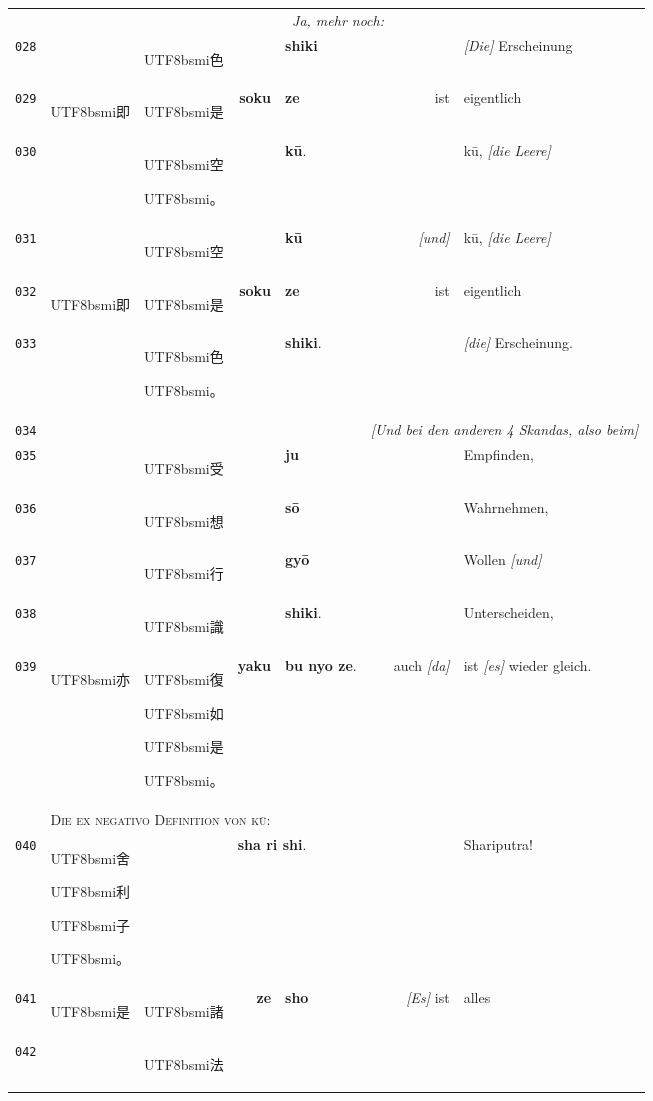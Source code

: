 \documentclass[
DIV=calc,
BCOR=5mm,
11pt,
headings=small,
oneside,
bibtotocnumbered,
english,ngerman]{scrartcl}
\newcommand{\cnbsmi}[1]{\begin{CJK}{UTF8}{bsmi}#1\end{CJK}}
\begin{document}
\begin{center}
\begin{tabular}{r|rl|rl|rl}
  ~ & ~ & ~ & ~ & \multicolumn{2}{l}{\textrm{~\emph{Ja, mehr noch:}}}  \\  
{\tiny\texttt{028}}&
  ~ & \cnbsmi{色} &
  ~ & \textbf{shiki} & 
  ~ & \textrm{\emph{[Die]} Erscheinung} \\  
{\tiny\texttt{029}}&
  \cnbsmi{即} & \cnbsmi{是} & 
  \textbf{soku} & \textbf{ze} &
  \textrm{ist} & \textrm{eigentlich} \\  
{\tiny\texttt{030}}&
  ~ & \cnbsmi{空} \cnbsmi{。} &
  ~ & \textbf{kū}. &
  ~ & \textrm{kū, \emph{[die Leere]}} \\
 \hdashline
 {\tiny\texttt{031}}&
  ~ & \cnbsmi{空} &
  ~ & \textbf{kū} & 
  \textrm{\emph{[und]}} & \textrm{kū, \emph{[die Leere]}} \\
{\tiny\texttt{032}}&
  \cnbsmi{即} & \cnbsmi{是} & 
  \textbf{soku} & \textbf{ze} &
  \textrm{ist} & \textrm{eigentlich} \\  
{\tiny\texttt{033}}&
 ~ & \cnbsmi{色} \cnbsmi{。} &
 ~ & \textbf{shiki}. &~
 ~ & \textrm{\emph{[die]} Erscheinung.} \\
 \hline
 {\tiny\texttt{034}}&
    ~ & ~ & ~ & ~ & \multicolumn{2}{l}{
    \textrm{\emph{[Und bei den anderen 4 Skandas, also beim]}}}\\
 {\tiny\texttt{035}}&
  ~ & \cnbsmi{受} &
  ~ & \textbf{ju} &
  ~ & \textrm{Empfinden,} \\
{\tiny\texttt{036}}&
  ~ & \cnbsmi{想} &
  ~ & \textbf{sō} &
  ~ & \textrm{Wahrnehmen,} \\
 {\tiny\texttt{037}}&
  ~ & \cnbsmi{行} &
  ~ & \textbf{gyō} &
  ~ & \textrm{Wollen \emph{[und]}} \\
 {\tiny\texttt{038}}&
  ~ & \cnbsmi{識} &
  ~ & \textbf{shiki}. &
  ~ & \textrm{Unterscheiden}, \\
{\tiny\texttt{039}}&
  \cnbsmi{亦} & \cnbsmi{復} \cnbsmi{如} \cnbsmi{是} \cnbsmi{。} &
  \textbf{yaku} & \textbf{bu nyo ze}. &
  \textrm{auch \emph{[da]}} & \textrm{ist \emph{[es]} wieder gleich}. \\
\hline
  ~ & \multicolumn{6}{l}{\textsc{Die ex negativo Definition von \textrm{kū}:}}\\
\hline
{\tiny\texttt{040}} &
  \multicolumn{2}{l|}{\cnbsmi{舍} \cnbsmi{利} \cnbsmi{子} \cnbsmi{。}} &
  \multicolumn{2}{l|}{\textbf{sha ri shi}.} &
  ~ & \textrm{Shariputra!}\\
\hline
{\tiny\texttt{041}}&
  \cnbsmi{是} & \cnbsmi{諸} &
  \textbf{ze} & \textbf{sho} &
  \textrm{\emph{[Es]} ist} & \textrm{alles} \\
{\tiny\texttt{042}}&
  ~ & \cnbsmi{法} &

\end{tabular}
\end{center}
\end{document}
